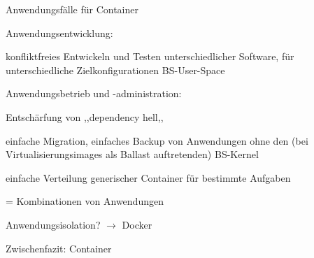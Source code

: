 \documentclass[a4paper]{article}
\begin{document}
\begin{multicols}{3}

    Anwendungsfälle für Container

    \begin{itemize*}
        \item
        Anwendungsentwicklung:
        \begin{itemize*}
            \item konfliktfreies Entwickeln und Testen unterschiedlicher Software, für unterschiedliche Zielkonfigurationen BS-User-Space
        \end{itemize*}
        \item
        Anwendungsbetrieb und -administration:
        \begin{itemize*}
            \item Entschärfung von ,,dependency hell,,
            \item einfache Migration, einfaches Backup von Anwendungen ohne den (bei Virtualisierungsimages als Ballast auftretenden) BS-Kernel
            \item einfache Verteilung generischer Container für bestimmte Aufgaben
            \item = Kombinationen von Anwendungen
        \end{itemize*}
        \item
        Anwendungsisolation? $\rightarrow$ Docker
    \end{itemize*}

    Zwischenfazit: Container


\end{multicols}
\end{document}
